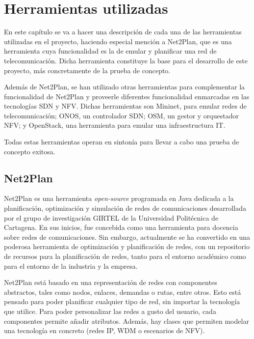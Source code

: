\chapter{Herramientas utilizadas}
\label{herramientas}

En este capítulo se va a hacer una descripción de cada una de las herramientas utilizadas en el proyecto, haciendo especial mención a Net2Plan, que es una herramienta cuya funcionalidad es la de emular y planificar una red de telecomunicación. Dicha herramienta constituye la base para el desarrollo de este proyecto, más concretamente de la prueba de concepto.

Además de Net2Plan, se han utilizado otras herramientas para complementar la funcionalidad de Net2Plan y proveerle diferentes funcionalidad enmarcadas en las tecnologías \ac{SDN} y \ac{NFV}. Dichas herramientas son Mininet, para emular redes de telecomunicación; ONOS, un controlador \ac{SDN}; \ac{OSM}, un gestor y orquestador \ac{NFV}; y OpenStack, una herramienta para emular una infraestructura IT.

Todas estas herramientas operan en sintonía para llevar a cabo una prueba de concepto exitosa.


\section{Net2Plan}
\label{sec:net2plan}

Net2Plan\cite{net2planbib} es una herramienta \textit{open-source} programada en Java dedicada a la planificación, optimización y simulación de redes de comunicaciones desarrollada por el grupo de investigación GIRTEL de la Universidad Politécnica de Cartagena. En sus inicios, fue concebida como una herramienta para docencia sobre redes de comunicaciones. Sin embargo, actualmente se ha convertido en una poderosa herramienta de optimización y planificación de redes, con un repositorio de recursos para la planificación de redes, tanto para el entorno académico como para el entorno de la industria y la empresa.

Net2Plan está basado en una representación de redes con componentes abstractos, tales como nodos, enlaces, demandas o rutas, entre otros. Esto está pensado para poder planificar cualquier tipo de red, sin importar la tecnología que utilice. Para poder personalizar las redes a gusto del usuario, cada componentes permite añadir atributos. Además, hay clases que permiten modelar una tecnología en concreto (redes \ac{IP}, \ac{WDM} o escenarios de \ac{NFV}).

